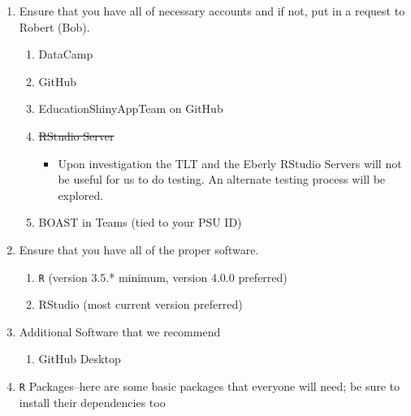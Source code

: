 \documentclass[]{book}
\providecommand{\tightlist}{%
  \setlength{\itemsep}{0pt}\setlength{\parskip}{0pt}}
\begin{document}
\begin{enumerate}
\def\labelenumi{\arabic{enumi}.}
\tightlist
\item
  Ensure that you have all of necessary accounts and if not, put in a request to Robert (Bob).

  \begin{enumerate}
  \def\labelenumii{\alph{enumii}.}
  \tightlist
  \item
    DataCamp\\
  \item
    GitHub\\
  \item
    EducationShinyAppTeam on GitHub\\
  \item
    \sout{RStudio Server}

    \begin{itemize}
    \tightlist
    \item
      Upon investigation the TLT and the Eberly RStudio Servers will not be useful for us to do testing. An alternate testing process will be explored.\\
    \end{itemize}
  \item
    BOAST in Teams (tied to your PSU ID)
  \end{enumerate}
\item
  Ensure that you have all of the proper software.

  \begin{enumerate}
  \def\labelenumii{\alph{enumii}.}
  \tightlist
  \item
    \texttt{R} (version 3.5.* minimum, version 4.0.0 preferred)\\
  \item
    RStudio (most current version preferred)\\
  \end{enumerate}
\item
  Additional Software that we recommend

  \begin{enumerate}
  \def\labelenumii{\alph{enumii}.}
  \tightlist
  \item
    GitHub Desktop\\
  \end{enumerate}
\item
  \texttt{R} Packages--here are some basic packages that everyone will need; be sure to install their dependencies too\\
\end{enumerate}
\end{document}
